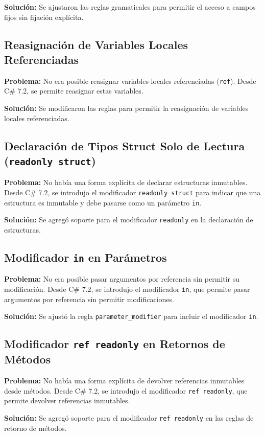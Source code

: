 \textbf{Solución:} Se ajustaron las reglas gramaticales para permitir el acceso a campos fijos sin fijación explícita.

\subsection*{Reasignación de Variables Locales Referenciadas}
\textbf{Problema:} No era posible reasignar variables locales referenciadas (\texttt{ref}). Desde C\# 7.2, se permite reasignar estas variables.

\textbf{Solución:} Se modificaron las reglas para permitir la reasignación de variables locales referenciadas.

\subsection*{Declaración de Tipos Struct Solo de Lectura (\texttt{readonly struct})}
\textbf{Problema:} No había una forma explícita de declarar estructuras inmutables. Desde C\# 7.2, se introdujo el modificador \texttt{readonly struct} para indicar que una estructura es inmutable y debe pasarse como un parámetro \texttt{in}.

\textbf{Solución:} Se agregó soporte para el modificador \texttt{readonly} en la declaración de estructuras.

\subsection*{Modificador \texttt{in} en Parámetros}
\textbf{Problema:} No era posible pasar argumentos por referencia sin permitir su modificación. Desde C\# 7.2, se introdujo el modificador \texttt{in}, que permite pasar argumentos por referencia sin permitir modificaciones.

\textbf{Solución:} Se ajustó la regla \texttt{parameter\_modifier} para incluir el modificador \texttt{in}.

\subsection*{Modificador \texttt{ref readonly} en Retornos de Métodos}
\textbf{Problema:} No había una forma explícita de devolver referencias inmutables desde métodos. Desde C\# 7.2, se introdujo el modificador \texttt{ref readonly}, que permite devolver referencias inmutables.

\textbf{Solución:} Se agregó soporte para el modificador \texttt{ref readonly} en las reglas de retorno de métodos.

